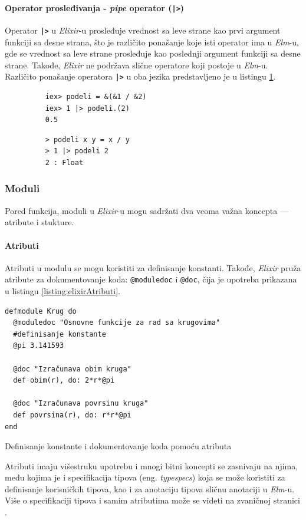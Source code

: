 \documentclass[12pt,oneside]{memoir}
\begin{document}
\paragraph{Operator prosleđivanja - \emph{pipe} operator (\texttt{\textbf{|>}})}
Operator \texttt{\textbf{|>}} u \emph{Elixir}-u prosleđuje vrednost sa leve strane kao prvi argument
funkciji sa desne strana, što je različito ponašanje koje isti operator ima u \emph{Elm}-u, gde se
vrednost sa leve strane prosleđuje kao poslednji argument funkciji sa desne
strane. Takođe, \emph{Elixir} ne podržava slične operatore koji postoje u \emph{Elm}-u. Različito ponašanje
operatora \texttt{\textbf{|>}} u oba jezika predstavljeno je u listingu \ref{listing:elixirPipe}.
\begin{figure}[!h]
\begin{minipage}{0.5\textwidth}
  \centering
  \begin{verbatim}
    iex> podeli = &(&1 / &2)
    iex> 1 |> podeli.(2)
    0.5
  \end{verbatim}
\end{minipage}
\begin{minipage}{0.5\textwidth}
  \centering
  \begin{verbatim}
    > podeli x y = x / y
    > 1 |> podeli 2
    2 : Float
  \end{verbatim}
\end{minipage}
\label{listing:elixirPipe}
\end{figure}
\subsubsection{Moduli}
Pored funkcija, moduli u \emph{Elixir}-u mogu sadržati dva veoma važna koncepta --- atribute i
stukture.
\paragraph{Atributi}
Atributi u modulu se mogu koristiti za definisanje konstanti. Takođe, \emph{Elixir} pruža atribute
za dokumentovanje koda: \texttt{@moduledoc} i \texttt{@doc}, čija je upotreba prikazana u
listingu \ref{listing:elixirAtributi}.
\begin{listing}[!h]
\begin{verbatim}
defmodule Krug do
  @moduledoc "Osnovne funkcije za rad sa krugovima"
  #definisanje konstante
  @pi 3.141593 

  @doc "Izračunava obim kruga"
  def obim(r), do: 2*r*@pi

  @doc "Izračunava povrsinu kruga"
  def povrsina(r), do: r*r*@pi
end
\end{verbatim}
\caption{Definisanje konstante i dokumentovanje koda pomoću atributa}
\label{listing:elixirAtributi}
\end{listing}
Atributi imaju višestruku upotrebu i mnogi bitni koncepti se zasnivaju na njima, među kojima
je i specifikacija tipova (eng. \emph{typespecs}) koja se može koristiti za definisanje
korisničkih tipova, kao i za anotaciju tipova sličnu anotaciji u \emph{Elm}-u. Više o specifikaciji
tipova i samim atributima može se videti na zvaničnoj stranici \cite{elixir}.
\end{document}
